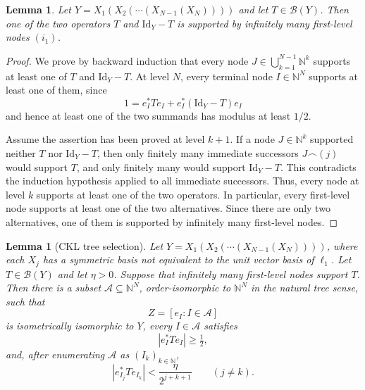 \documentclass[11pt]{amsart}
\theoremstyle{plain}
\newtheorem{lemma}[theorem]{Lemma}
\theoremstyle{definition}
\numberwithin{equation}{section}
\newcommand{\Bop}{\mathcal{B}}
\newcommand{\N}{\mathbb{N}}
\newcommand{\Id}{\mathrm{Id}}
\renewcommand{\ge}{\geqslant}
\begin{document}
\begin{lemma}\label{lmm: infinitely-support}
    Let $Y=X_1(X_2(\cdots(X_{N-1}(X_N))))$ and let $T\in\Bop(Y)$. Then one of the two operators $T$ and $\Id_Y-T$ is supported by infinitely many first-level nodes $(i_1)$.
\end{lemma}

\begin{proof}
    We prove by backward induction that every node $J\in\bigcup_{k=1}^{N-1}\N^k$ supports at least one of $T$ and $\Id_Y-T$. At level $N$, every terminal node $I\in\N^N$ supports at least one of them, since
    \[
        1=e_I^*Te_I+e_I^*(\Id_Y-T)e_I
    \]
    and hence at least one of the two summands has modulus at least $1/2$.
    
    Assume the assertion has been proved at level $k+1$. If a node $J\in\N^k$ supported neither $T$ nor $\Id_Y-T$, then only finitely many immediate successors $J\smallfrown(j)$ would support $T$, and only finitely many would support $\Id_Y-T$. This contradicts the induction hypothesis applied to all immediate successors. Thus, every node at level $k$ supports at least one of the two operators. In particular, every first-level node supports at least one of the two alternatives. Since there are only two alternatives, one of them is supported by infinitely many first-level nodes.
\end{proof}
\begin{lemma}[CKL tree selection]\label{lem:CKL-tree-selection}
    Let $Y=X_1(X_2(\cdots(X_{N-1}(X_N))))$, where each $X_j$ has a symmetric basis not equivalent to the unit vector basis of $\ell_1$. Let $T\in\Bop(Y)$ and let $\eta>0$. Suppose that infinitely many first-level nodes support $T$. Then there is a subset $\mathcal A\subseteq\N^N$, order-isomorphic to $\N^N$ in the natural tree sense, such that
    \[
        Z=[e_I:I\in\mathcal A]
    \]
    is isometrically isomorphic to $Y$, every $I\in\mathcal A$ satisfies
    \[
        |e_I^*Te_I|\ge \tfrac12,
    \]
    and, after enumerating $\mathcal A$ as $(I_k)_{k\in\N}$,
    \[
        |e_{I_j}^*Te_{I_k}|<\frac{\eta}{2^{j+k+1}}
        \qquad(j\neq k).
    \]
\end{lemma}
\end{document}
